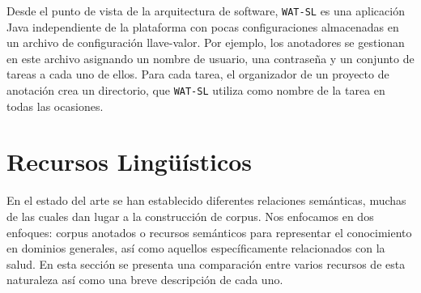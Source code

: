 Desde el punto de vista de la arquitectura de software, \texttt{WAT-SL} es una aplicación Java independiente de la plataforma con pocas configuraciones almacenadas en un archivo de configuración llave-valor.
Por ejemplo, los anotadores se gestionan en este archivo asignando un nombre de usuario, una contraseña y un conjunto de tareas a cada uno de ellos.
Para cada tarea, el organizador de un proyecto de anotación crea un directorio, que \texttt{WAT-SL} utiliza como nombre de la tarea en todas las ocasiones.

\section{Recursos Lingüísticos}\label{sec:sota-corpora}

En el estado del arte se han establecido diferentes relaciones semánticas, muchas de las cuales dan lugar a la construcción de corpus. Nos enfocamos en dos enfoques: corpus anotados o recursos semánticos para representar el conocimiento en dominios generales, así como aquellos específicamente relacionados con la salud.
En esta sección se presenta una comparación entre varios recursos de esta naturaleza así como una breve descripción de cada uno.

\newcommand{\corpus}[1]{\rotatebox{90}{\textbf{#1}}}

